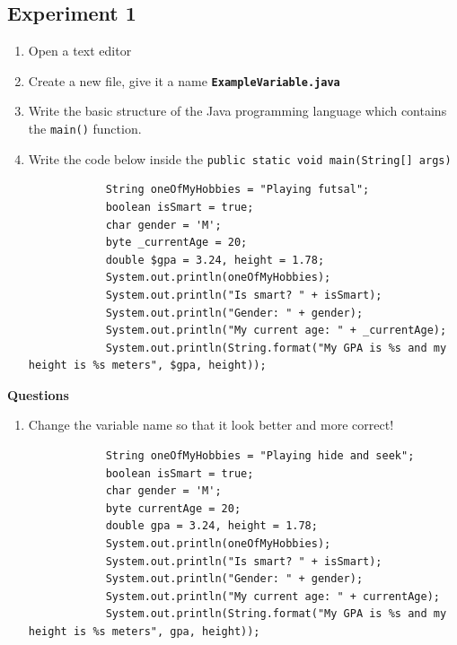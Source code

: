 \documentclass[12pt,titlepage]{article}
\begin{document}
\subsection{Experiment 1}
\begin{enumerate}
    \item Open a text editor
    \item Create a new file, give it a name \texttt{\textbf{ExampleVariable.java}}
    \item Write the basic structure of the Java programming language which contains the \texttt{main()} function.
    \item { 
        Write the code below inside the \texttt{public static void main(String[] args)}
        
        \begin{verbatim}
            String oneOfMyHobbies = "Playing futsal";
            boolean isSmart = true;
            char gender = 'M';
            byte _currentAge = 20;
            double $gpa = 3.24, height = 1.78;
            System.out.println(oneOfMyHobbies);
            System.out.println("Is smart? " + isSmart);
            System.out.println("Gender: " + gender);
            System.out.println("My current age: " + _currentAge);
            System.out.println(String.format("My GPA is %s and my height is %s meters", $gpa, height));
        \end{verbatim}
    }
\end{enumerate}
\textbf{Questions}
\begin{enumerate}
    \item { 
        Change the variable name so that it look better and more correct!

        \begin{verbatim}
            String oneOfMyHobbies = "Playing hide and seek";
            boolean isSmart = true;
            char gender = 'M';
            byte currentAge = 20;
            double gpa = 3.24, height = 1.78;
            System.out.println(oneOfMyHobbies);
            System.out.println("Is smart? " + isSmart);
            System.out.println("Gender: " + gender);
            System.out.println("My current age: " + currentAge);
            System.out.println(String.format("My GPA is %s and my height is %s meters", gpa, height));
        \end{verbatim}
    }
\end{enumerate}
\end{document}
